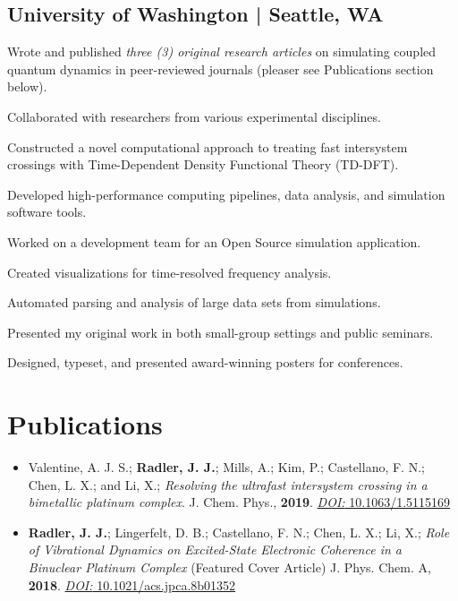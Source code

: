 \documentclass[letterpaper]{radler-resume-class}
\begin{document}
\begin{minipage}[t]{0.65\textwidth}
\subsection{University of Washington | Seattle, WA}
\begin{tightitemize}
\item Wrote and published \textit{three (3) original research articles} on simulating coupled quantum dynamics in peer-reviewed journals (pleaser see Publications section below).
\item Collaborated with researchers from various experimental disciplines. 
\item Constructed a novel computational approach to treating fast intersystem crossings with Time-Dependent Density Functional Theory (TD-DFT).
\item Developed high-performance computing pipelines, data analysis, and simulation software tools. 
\item Worked on a development team for an Open Source simulation application. 
\item Created visualizations for time-resolved frequency analysis.
\item Automated parsing and analysis of large data sets from simulations.
\item Presented my original work in both small-group settings and public seminars.
\item Designed, typeset, and presented award-winning posters for conferences. 
\end{tightitemize}
\sectionspace %

\section{Publications}
\sectionspace
\begin{itemize}
\item Valentine, A. J. S.; \textbf{Radler, J. J.}; Mills, A.; Kim, P.; Castellano, F. N.; Chen, L. X.; and Li, X.;	\textit{Resolving the ultrafast intersystem crossing in a bimetallic platinum complex}. J. Chem. Phys., \textbf{2019}. \href{https://doi.org/10.1063/1.5115169}{\textit{DOI: }10.1063/1.5115169}

\item \textbf{Radler, J. J.}; Lingerfelt, D. B.; Castellano, F. N.; Chen, L. X.; Li, X.;	\textit{Role of Vibrational Dynamics on Excited-State Electronic Coherence in a Binuclear Platinum Complex} (Featured Cover Article) J. Phys. Chem. A, \textbf{2018}. \href{https://pubs.acs.org/doi/10.1021/acs.jpca.8b01352}{\textit{DOI:} 10.1021/acs.jpca.8b01352}


\end{itemize}
\end{minipage}
\end{document}
